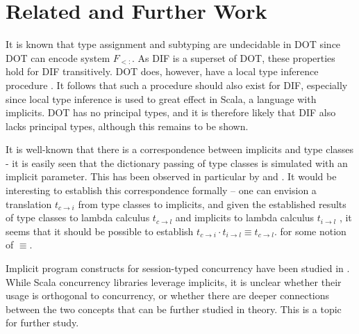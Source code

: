 \section{Related and Further Work}

It is known that type assignment and subtyping are undecidable in DOT
\cite{AR16} since DOT can encode system $F_{<:}$. As DIF is a superset of DOT,
these properties hold for DIF transitively. DOT does, however, have a local type
inference procedure \cite{PT00}. It follows that such a procedure should also
exist for DIF, especially since local type inference is used to great effect in
Scala, a language with implicits. DOT has no principal types, and it is
therefore likely that DIF also lacks principal types, although this remains to
be shown.

It is well-known that there is a correspondence between implicits and type
classes - it is easily seen that the dictionary passing of type classes is
simulated with an implicit parameter. This has been observed in particular by
\cite{OMO10} and \cite{OSCLYW12}. It would be interesting to establish this
correspondence formally -- one can envision a translation $t_{c \rightarrow i}$
from type classes to implicits, and given the established results of type
classes to lambda calculus $t_{c \rightarrow l}$ \cite{WB89} and implicits to
lambda calculus $t_{i \rightarrow l}$ \cite{OBLB18}, it seems that it should be
possible to establish $t_{c \rightarrow i} \cdot t_{i \rightarrow l} \equiv t_{c
\rightarrow l}$. for some notion of $\equiv$.

Implicit program constructs for session-typed concurrency have been studied in
\cite{JB18}. While Scala concurrency libraries leverage implicits, it is unclear
whether their usage is orthogonal to concurrency, or whether there are deeper
connections between the two concepts that can be further studied in theory. This
is a topic for further study.
